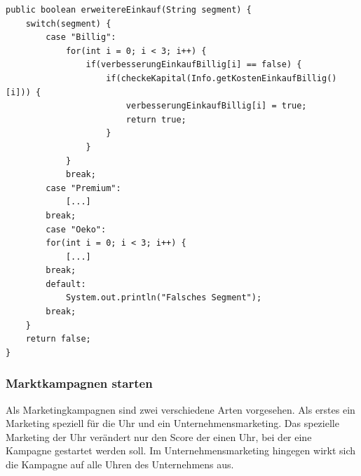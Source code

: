 \begin{lstlisting}
public boolean erweitereEinkauf(String segment) {
	switch(segment) {
		case "Billig":
			for(int i = 0; i < 3; i++) {
				if(verbesserungEinkaufBillig[i] == false) {
					if(checkeKapital(Info.getKostenEinkaufBillig()[i])) {
						verbesserungEinkaufBillig[i] = true;
						return true;
					}
				}
			}
			break;
		case "Premium":
			[...]
		break;
		case "Oeko":
		for(int i = 0; i < 3; i++) {
			[...]
		break;
		default:
			System.out.println("Falsches Segment");
		break;
	}
	return false;
}
\end{lstlisting}

\subsubsection{Marktkampagnen starten}
Als Marketingkampagnen sind zwei verschiedene Arten vorgesehen. Als erstes ein Marketing speziell für die Uhr und ein Unternehmensmarketing. Das spezielle Marketing der Uhr verändert nur den Score der einen Uhr, bei der eine Kampagne gestartet werden soll. Im Unternehmensmarketing hingegen wirkt sich die Kampagne auf alle Uhren des Unternehmens aus.

